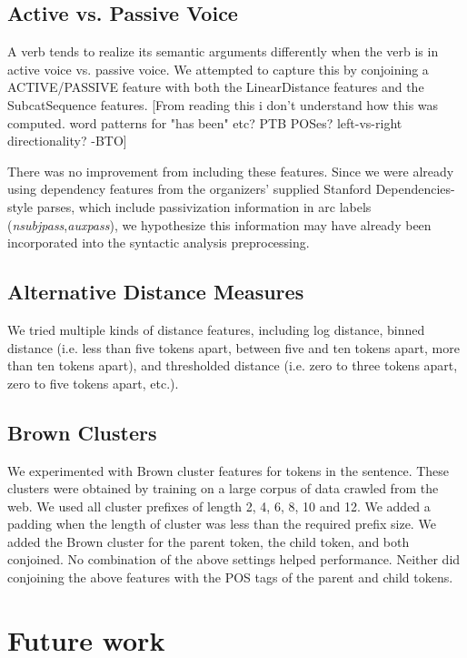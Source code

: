 \documentclass[11pt]{article}
\newcommand{\bocomment}[1]{\textcolor{Bittersweet}{[#1 -BTO]}}
\begin{document}
\subsection{Active vs. Passive Voice}
A verb tends to realize its semantic arguments differently when the verb is in
active voice vs. passive voice.
We attempted to capture this by conjoining a ACTIVE/PASSIVE feature with both
the LinearDistance features and the SubcatSequence features.
\bocomment{From reading this i don't understand how this was computed. word patterns for "has been" etc? PTB POSes? left-vs-right directionality?}

There was no improvement from including these features.
Since we were already using dependency features from the 
organizers' supplied Stanford Dependencies-style parses,
which include passivization information in arc labels (\emph{nsubjpass},\emph{auxpass}),
we hypothesize this information may have already been incorporated into the syntactic analysis preprocessing.

\subsection{Alternative Distance Measures}
We tried multiple kinds of distance features, including log distance, binned
distance (i.e. less than five tokens apart, between five and ten tokens apart, more than
ten tokens apart), and thresholded distance (i.e. zero to three tokens apart,
zero to five tokens apart, etc.).

\subsection{Brown Clusters}
We experimented with Brown cluster features \cite{Brown:1992:CNG:176313.176316}
for tokens in the sentence.
These clusters were obtained by training on a large corpus of data crawled from
the web.
We used all cluster prefixes of length 2, 4, 6, 8, 10 and 12.
We added a padding when the length of cluster was less than the required prefix
size.
We added the Brown cluster for the parent token, the child token, and both
conjoined.
No combination of the above settings helped performance.
Neither did conjoining the above features with the POS tags of the parent and
child tokens.


\section{Future work}
\end{document}
